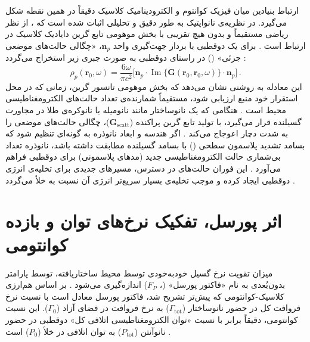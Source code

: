 \documentclass[12pt,a4paper]{report}
\newcommand{\sub}[1]{\mathrm{#1}}               %
\newcommand{\Imag}{\operatorname{Im}}
\begin{document}
ارتباط بنیادین میان فیزیک کوانتوم و الکترودینامیک کلاسیک دقیقاً در همین نقطه شکل می‌گیرد. در نظریه‌ی نانواپتیک به طور دقیق و تحلیلی اثبات شده است که ، از نظر ریاضی مستقیماً و بدون هیچ تقریبی با بخش موهومی تابع گرین دایادیک کلاسیک در ارتباط است \cite{novotny}. برای یک دوقطبی با بردار جهت‌گیری واحد $\mathbf{n}_p$، «چگالی حالت‌های موضعی جزئی» () در راستای دوقطبی به صورت جبری زیر استخراج می‌گردد \cite{novotny}:
\begin{equation}
\rho_p(\mathbf{r}_0,\omega)=\frac{6\omega}{\pi c^2}\Big[\mathbf{n}_p\cdot\Imag\{\mathbf{G}(\mathbf{r}_0,\mathbf{r}_0,\omega)\}\cdot\mathbf{n}_p\Big]\,.
\end{equation}
این معادله به روشنی نشان می‌دهد که بخش موهومی تانسور گرین، زمانی که در محل استقرار خود منبع ارزیابی شود، مستقیماً شمارنده‌ی تعداد حالت‌های الکترومغناطیسی محیط است \cite{novotny}. هنگامی که یک نانوساختار مانند نانومیله یا نانوکره‌ی طلا در مجاورت گسیلنده قرار می‌گیرد، با تولید تابع گرین پراکنده ($\mathbf{G}_{\sub{scatt}}$)، چگالی حالت‌های موضعی را به شدت دچار اعوجاج می‌کند \cite{novotny,maier}. اگر هندسه و ابعاد نانوذره به گونه‌ای تنظیم شود که بسامد تشدید پلاسمون سطحی () با بسامد گسیلنده مطابقت داشته باشد، نانوذره تعداد بی‌شماری حالت الکترومغناطیسی جدید (مدهای پلاسمونی) برای دوقطبی فراهم می‌آورد \cite{maier,novotny}. این فوران حالت‌های در دسترس، مسیرهای جدیدی برای تخلیه‌ی انرژی دوقطبی ایجاد کرده و موجب تخلیه‌ی بسیار سریع‌تر انرژی آن نسبت به خلأ می‌گردد \cite{novotny,maier}.

\section{اثر پورسل، تفکیک نرخ‌های توان و بازده کوانتومی}
میزان تقویت نرخ گسیل خودبه‌خودی توسط محیط ساختاریافته، توسط پارامتر بدون‌بُعدی به نام «فاکتور پورسل» (، $F_P$) اندازه‌گیری می‌شود \cite{purcell,novotny}. بر اساس هم‌ارزی کلاسیک-کوانتومی که پیش‌تر تشریح شد، فاکتور پورسل معادل است با نسبت نرخ فروافت کل در حضور نانوساختار ($\Gamma_{\sub{tot}}$) به نرخ فروافت در فضای آزاد ($\Gamma_0$). این نسبت کوانتومی، دقیقاً برابر با نسبت «توان الکترومغناطیسی اتلافی کل» دوقطبی در حضور نانوآنتن ($P_{\sub{tot}}$) به توان اتلافی در خلأ ($P_0$) است \cite{novotny}.
\end{document}
